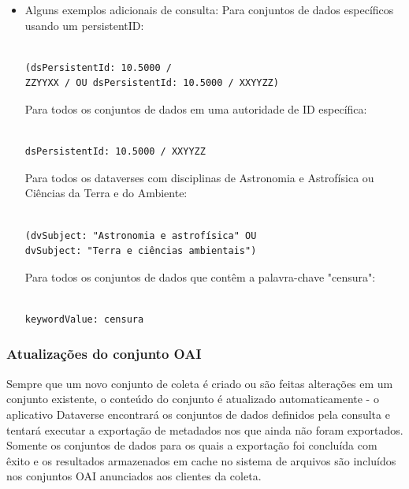\documentclass[12pt,hidelinks]{article}
\begin{document}
\begin{itemize}
\begin{verbatim}
\end{verbatim}

 \item Alguns exemplos adicionais de consulta:
Para conjuntos de dados específicos usando um persistentID:

\begin{verbatim}

(dsPersistentId: 10.5000 / 
ZZYYXX / OU dsPersistentId: 10.5000 / XXYYZZ)

\end{verbatim}

Para todos os conjuntos de dados em uma autoridade de ID específica:

 \begin{verbatim}

dsPersistentId: 10.5000 / XXYYZZ

\end{verbatim}

Para todos os dataverses com disciplinas de Astronomia e Astrofísica ou Ciências da Terra e do Ambiente:

\begin{verbatim}

(dvSubject: "Astronomia e astrofísica" OU
dvSubject: "Terra e ciências ambientais")

\end{verbatim}

Para todos os conjuntos de dados que contêm a palavra-chave "censura":

\begin{verbatim}

keywordValue: censura

\end{verbatim}

\end{itemize}

\subsubsection{Atualizações do conjunto OAI}

\qquad Sempre que um novo conjunto de coleta é criado ou são feitas alterações em um conjunto existente, o conteúdo do conjunto é atualizado automaticamente - o aplicativo Dataverse encontrará os conjuntos de dados definidos pela consulta e tentará executar a exportação de metadados nos que ainda não foram exportados. Somente os conjuntos de dados para os quais a exportação foi concluída com êxito e os resultados armazenados em cache no sistema de arquivos são incluídos nos conjuntos OAI anunciados aos clientes da coleta.
\end{document}

